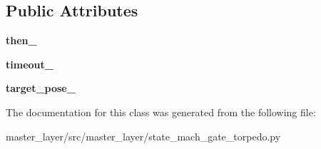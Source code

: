 \subsection*{Public Attributes}
\begin{DoxyCompactItemize}
\item 
\mbox{\label{classmaster__layer_1_1state__mach__gate__torpedo_1_1MoveToXYZ_a8e58005fcbde075fba55ba225bfba933}} 
{\bfseries then\+\_\+}
\item 
\mbox{\label{classmaster__layer_1_1state__mach__gate__torpedo_1_1MoveToXYZ_a28a5c716de2c8d532a8842e79ef94721}} 
{\bfseries timeout\+\_\+}
\item 
\mbox{\label{classmaster__layer_1_1state__mach__gate__torpedo_1_1MoveToXYZ_a2c891d5bfdd04b183932c1ca0805bb61}} 
{\bfseries target\+\_\+pose\+\_\+}
\end{DoxyCompactItemize}


The documentation for this class was generated from the following file\+:\begin{DoxyCompactItemize}
\item 
master\+\_\+layer/src/master\+\_\+layer/state\+\_\+mach\+\_\+gate\+\_\+torpedo.\+py\end{DoxyCompactItemize}
